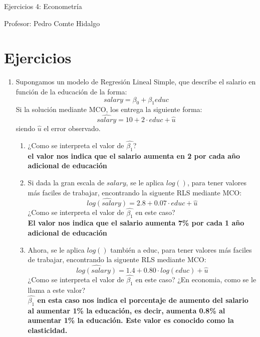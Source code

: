 \documentclass[10pt,a4paper]{article}
\begin{document}
\vspace{5cm}

\begin{center}
    {\Large  Ejercicios 4: Econometría }

Profesor:    Pedro Comte Hidalgo
\end{center}



\section{Ejercicios}
\begin{enumerate}
    \item Supongamos un modelo de Regresión Lineal Simple, que describe el salario en función de la educación de la forma:
    $$salary = \beta_0 + \beta_1 educ$$
    Si la solución mediante MCO, los entrega la siguiente forma:
        $$\hat{salary} = 10 + 2\cdot educ + \hat{u}$$
    siendo $\hat{u}$ el error observado.
    \begin{enumerate}
        \item  ¿Como se interpreta el valor de $\hat{\beta_1}$?  \\
        \textbf{el valor nos indica que el salario aumenta en 2 por cada año adicional de educación}

        \item Si dada la gran escala de $salary$, se le aplica $log()$, para tener valores más faciles de trabajar, encontrando la siguente RLS mediante MCO:
        $$\hat{log({salary})} = 2.8 + 0.07\cdot educ + \hat{u}$$
        ¿Como se interpreta el valor de $\hat{\beta_1}$ en este caso?  \\
        \textbf{El valor nos indica que el salario aumenta 7\% por cada 1 año adicional de educación}
        \item Ahora, se le aplica $log()$ también a educ, para tener valores más faciles de trabajar, encontrando la siguente RLS mediante MCO:
        $$\hat{log({salary})} = 1.4 + 0.80\cdot log(educ) + \hat{u}$$
        ¿Como se interpreta el valor de $\hat{\beta_1}$ en este caso? ¿En economia, como se le llama a este valor?\\
        \textbf{$\hat{\beta_1}$ en esta caso nos indica el porcentaje de aumento del salario al aumentar 1\% la educación, es decir, aumenta 0.8\% al aumentar 1\% la educación. Este valor es conocido como la elasticidad.}
    \end{enumerate}



\end{enumerate}
\end{document}
